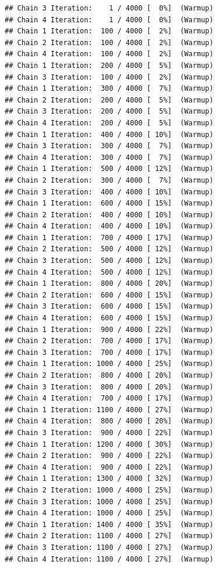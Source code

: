 \documentclass[
]{article}
\begin{document}
\begin{verbatim}
## Chain 3 Iteration:    1 / 4000 [  0%]  (Warmup) 
## Chain 4 Iteration:    1 / 4000 [  0%]  (Warmup) 
## Chain 1 Iteration:  100 / 4000 [  2%]  (Warmup) 
## Chain 2 Iteration:  100 / 4000 [  2%]  (Warmup) 
## Chain 4 Iteration:  100 / 4000 [  2%]  (Warmup) 
## Chain 1 Iteration:  200 / 4000 [  5%]  (Warmup) 
## Chain 3 Iteration:  100 / 4000 [  2%]  (Warmup) 
## Chain 1 Iteration:  300 / 4000 [  7%]  (Warmup) 
## Chain 2 Iteration:  200 / 4000 [  5%]  (Warmup) 
## Chain 3 Iteration:  200 / 4000 [  5%]  (Warmup) 
## Chain 4 Iteration:  200 / 4000 [  5%]  (Warmup) 
## Chain 1 Iteration:  400 / 4000 [ 10%]  (Warmup) 
## Chain 3 Iteration:  300 / 4000 [  7%]  (Warmup) 
## Chain 4 Iteration:  300 / 4000 [  7%]  (Warmup) 
## Chain 1 Iteration:  500 / 4000 [ 12%]  (Warmup) 
## Chain 2 Iteration:  300 / 4000 [  7%]  (Warmup) 
## Chain 3 Iteration:  400 / 4000 [ 10%]  (Warmup) 
## Chain 1 Iteration:  600 / 4000 [ 15%]  (Warmup) 
## Chain 2 Iteration:  400 / 4000 [ 10%]  (Warmup) 
## Chain 4 Iteration:  400 / 4000 [ 10%]  (Warmup) 
## Chain 1 Iteration:  700 / 4000 [ 17%]  (Warmup) 
## Chain 2 Iteration:  500 / 4000 [ 12%]  (Warmup) 
## Chain 3 Iteration:  500 / 4000 [ 12%]  (Warmup) 
## Chain 4 Iteration:  500 / 4000 [ 12%]  (Warmup) 
## Chain 1 Iteration:  800 / 4000 [ 20%]  (Warmup) 
## Chain 2 Iteration:  600 / 4000 [ 15%]  (Warmup) 
## Chain 3 Iteration:  600 / 4000 [ 15%]  (Warmup) 
## Chain 4 Iteration:  600 / 4000 [ 15%]  (Warmup) 
## Chain 1 Iteration:  900 / 4000 [ 22%]  (Warmup) 
## Chain 2 Iteration:  700 / 4000 [ 17%]  (Warmup) 
## Chain 3 Iteration:  700 / 4000 [ 17%]  (Warmup) 
## Chain 1 Iteration: 1000 / 4000 [ 25%]  (Warmup) 
## Chain 2 Iteration:  800 / 4000 [ 20%]  (Warmup) 
## Chain 3 Iteration:  800 / 4000 [ 20%]  (Warmup) 
## Chain 4 Iteration:  700 / 4000 [ 17%]  (Warmup) 
## Chain 1 Iteration: 1100 / 4000 [ 27%]  (Warmup) 
## Chain 4 Iteration:  800 / 4000 [ 20%]  (Warmup) 
## Chain 3 Iteration:  900 / 4000 [ 22%]  (Warmup) 
## Chain 1 Iteration: 1200 / 4000 [ 30%]  (Warmup) 
## Chain 2 Iteration:  900 / 4000 [ 22%]  (Warmup) 
## Chain 4 Iteration:  900 / 4000 [ 22%]  (Warmup) 
## Chain 1 Iteration: 1300 / 4000 [ 32%]  (Warmup) 
## Chain 2 Iteration: 1000 / 4000 [ 25%]  (Warmup) 
## Chain 3 Iteration: 1000 / 4000 [ 25%]  (Warmup) 
## Chain 4 Iteration: 1000 / 4000 [ 25%]  (Warmup) 
## Chain 1 Iteration: 1400 / 4000 [ 35%]  (Warmup) 
## Chain 2 Iteration: 1100 / 4000 [ 27%]  (Warmup) 
## Chain 3 Iteration: 1100 / 4000 [ 27%]  (Warmup) 
## Chain 4 Iteration: 1100 / 4000 [ 27%]  (Warmup) 

\end{verbatim}
\end{document}
